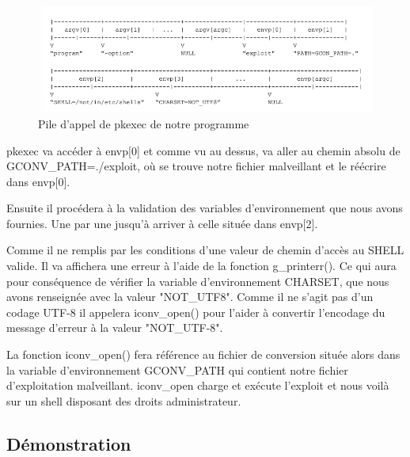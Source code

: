 \documentclass[12pt,a4paper]{article}
\begin{document}
\begin{flushleft}
\begin{enumerate}
            \end{enumerate}
            \begin{center}
                \begin{figure}
                    \caption{Pile d'appel de pkexec de notre programme \cite{CVE2021425:online}}
                    \includegraphics[scale=0.5]{pile d'appel programme final} 
                 \end{figure}
            \end{center}
            \item pkexec va accéder à envp[0] et comme vu au dessus, va aller au chemin absolu de GCONV\_PATH=./exploit, où se trouve notre fichier malveillant et le réécrire dans envp[0].
            \item Ensuite il procédera à la validation des variables d'environnement que nous avons fournies. Une par une jusqu'à arriver à celle située dans envp[2].
            \item Comme il ne remplis par les conditions d'une valeur de chemin d'accès au SHELL valide. Il va affichera une erreur à l'aide de la fonction g\_printerr(). Ce qui aura pour conséquence de vérifier la variable d'environnement CHARSET, que nous avons renseignée avec la valeur "NOT\_UTF8". Comme il ne s'agit pas d'un codage UTF-8 il appelera iconv\_open() pour l'aider à convertir l'encodage du message d'erreur à la valeur "NOT\_UTF-8".
            \item La fonction iconv\_open() fera référence au fichier de conversion située alors dans la variable d'environnement GCONV\_PATH qui contient notre fichier d'exploitation malveillant. iconv\_open charge et exécute l'exploit et nous voilà sur un shell disposant des droits administrateur.

    \end{flushleft}
       \newpage

   		\subsection{Démonstration}
\end{document}

